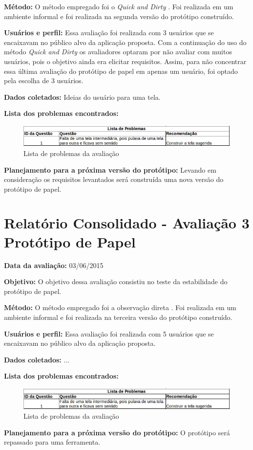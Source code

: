 \textbf{Método:}
O método empregado foi o \textit{Quick and Dirty} \cite{preece}. Foi realizada em um ambiente informal e foi realizada na segunda versão do protótipo construído.

\textbf{Usuários e perfil:}
Essa avaliação foi realizada com 3 usuários que se encaixavam no público alvo da aplicação proposta. Com a continuação do uso do método \textit{Quick and Dirty} os avaliadores optaram por não avaliar com muitos usuários, pois o objetivo ainda era elicitar requisitos. Assim, para não concentrar essa última avaliação do protótipo de papel em apenas um usuário, foi optado pela escolha de 3 usuários.

\textbf{Dados coletados:}
Ideias do usuário para uma tela.

\textbf{Lista dos problemas encontrados:}
\begin{figure}[h!]
  \centering
    \includegraphics[keepaspectratio=true, scale=0.7]{figuras/problema2.png}
  \caption{Lista de problemas da avaliação}
\end{figure}

\textbf{Planejamento para a próxima versão do protótipo:}
Levando em consideração os requisitos levantados será construída uma nova versão do protótipo de papel.

\vfill
\pagebreak
\section{Relatório Consolidado - Avaliação 3 Protótipo de Papel}

\textbf{Data da avaliação:} 03/06/2015

\textbf{Objetivo:}
O objetivo dessa avaliação consistiu no teste da estabilidade do protótipo de papel.

\textbf{Método:}
O método empregado foi a observação direta \cite{preece}. Foi realizada em um ambiente informal e foi realizada na terceira versão do protótipo construído.

\textbf{Usuários e perfil:}
Essa avaliação foi realizada com 5 usuários que se encaixavam no público alvo da aplicação proposta. 

\textbf{Dados coletados:}
...

\textbf{Lista dos problemas encontrados:}
\begin{figure}[h!]
  \centering
    \includegraphics[keepaspectratio=true, scale=0.7]{figuras/problema2.png}
  \caption{Lista de problemas da avaliação}
\end{figure}

\textbf{Planejamento para a próxima versão do protótipo:}
O protótipo será repassado para uma ferramenta.
 